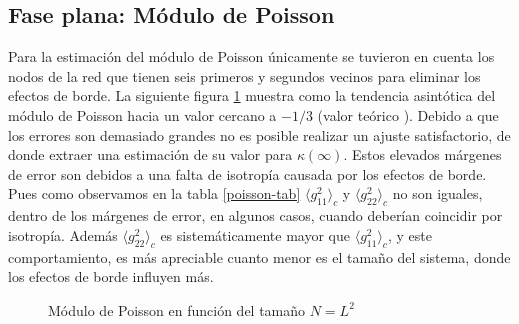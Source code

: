 \clearpage

\subsection{Fase plana: Módulo de Poisson}

Para la estimación del módulo de Poisson únicamente se tuvieron en cuenta los
nodos de la red que tienen seis primeros y segundos vecinos para eliminar los
efectos de borde. La siguiente figura \ref{poisson-fig} muestra como la tendencia asintótica del
módulo de Poisson hacia un valor cercano a $-1/3$ (valor teórico
\cite{Doussal:nu}). Debido a que los errores son demasiado grandes
no es posible realizar un ajuste satisfactorio, de donde extraer una
estimación de su valor para $\kappa(\infty)$. Estos elevados
márgenes de error son debidos a una falta de isotropía causada por los efectos
de borde. Pues como observamos en la tabla \ref{poisson-tab} $\langle g_{11}^2
\rangle_c$ y $\langle g_{22}^2 \rangle_c$ no son iguales, dentro de los
márgenes de error, en algunos casos, cuando deberían coincidir por isotropía. Además $\langle
g_{22}^2 \rangle_c$ es sistemáticamente mayor que $\langle g_{11}^2\rangle_c$, y
este comportamiento, es más apreciable cuanto menor es el tamaño del sistema,
donde los efectos de borde influyen más.
 
\begin{figure}[h]
  \centering
  
  \caption{Módulo de Poisson en función del tamaño $N=L^2$}\label{poisson-fig}
\end{figure}

